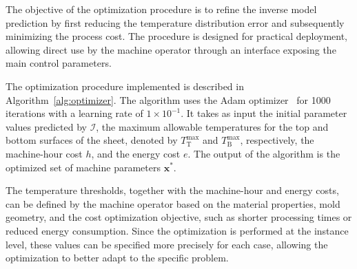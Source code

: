 \label{chap:optimization}

The objective of the optimization procedure is to refine the inverse model prediction by first reducing the temperature distribution error and subsequently minimizing the process cost. The procedure is designed for practical deployment, allowing direct use by the machine operator through an interface exposing the main control parameters.

The optimization procedure implemented is described in Algorithm~\ref{alg:optimizer}. The algorithm uses the Adam optimizer~\cite{kingma2014adam} for 1000 iterations with a learning rate of $1 \times 10^{-1}$. It takes as input the initial parameter values predicted by $\mathcal{I}$, the maximum allowable temperatures for the top and bottom surfaces of the sheet, denoted by $T_\text{T}^{\max}$ and $T_\text{B}^{\max}$, respectively, the machine-hour cost $h$, and the energy cost $e$. The output of the algorithm is the optimized set of machine parameters $\mathbf{x}^{*}$.

The temperature thresholds, together with the machine-hour and energy costs, can be defined by the machine operator based on the material properties, mold geometry, and the cost optimization objective, such as shorter processing times or reduced energy consumption. Since the optimization is performed at the instance level, these values can be specified more precisely for each case, allowing the optimization to better adapt to the specific problem.


